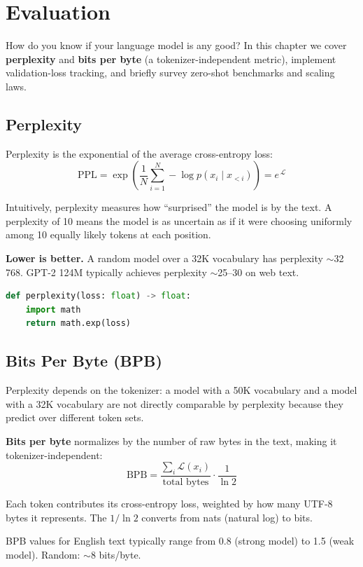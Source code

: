 \chapter{Evaluation}
\label{ch:eval}

How do you know if your language model is any good?  In this chapter we cover \textbf{perplexity} and \textbf{bits per byte} (a tokenizer-independent metric), implement validation-loss tracking, and briefly survey zero-shot benchmarks and scaling laws.


\section{Perplexity}

Perplexity is the exponential of the average cross-entropy loss:
\[
  \text{PPL} = \exp\!\left(\frac{1}{N}\sum_{i=1}^{N} -\log p(x_i \mid x_{<i})\right) = e^{\,\mathcal{L}}
\]

Intuitively, perplexity measures how ``surprised'' the model is by the text.  A perplexity of 10 means the model is as uncertain as if it were choosing uniformly among 10 equally likely tokens at each position.

\textbf{Lower is better.}  A random model over a 32K vocabulary has perplexity $\sim$32\,768.  GPT-2 124M typically achieves perplexity $\sim$25--30 on web text.

\begin{lstlisting}[language=Python]
def perplexity(loss: float) -> float:
    import math
    return math.exp(loss)
\end{lstlisting}


\section{Bits Per Byte (BPB)}

Perplexity depends on the tokenizer: a model with a 50K vocabulary and a model with a 32K vocabulary are not directly comparable by perplexity because they predict over different token sets.

\textbf{Bits per byte} normalizes by the number of raw bytes in the text, making it tokenizer-independent:
\[
  \text{BPB} = \frac{\sum_i \mathcal{L}(x_i)}{\text{total bytes}} \cdot \frac{1}{\ln 2}
\]

Each token contributes its cross-entropy loss, weighted by how many UTF-8 bytes it represents.  The $1/\ln 2$ converts from nats (natural log) to bits.

BPB values for English text typically range from 0.8 (strong model) to 1.5 (weak model).  Random: $\sim$8 bits/byte.

